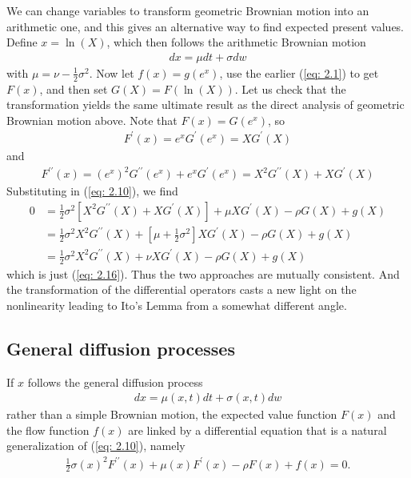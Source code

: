 \documentclass[\topdir/lecture\_notes.tex]{subfiles}
\begin{document}
\begin{optional}
We can change variables to transform geometric Brownian motion into an arithmetic one, and this gives an alternative way to find expected present values. Define $x=\ln (X)$, which then follows the arithmetic Brownian motion
\begin{align*}
dx=\mu dt+\sigma dw 
\end{align*}
with $\mu=\nu-\frac{1}{2} \sigma^{2}$. Now let $f(x)=g\left(e^{x}\right)$, use the earlier (\ref{eq: 2.1}) to get $F(x)$, and then set $G(X)=F(\ln (X))$. Let us check that the transformation yields the same ultimate result as the direct analysis of geometric Brownian motion above. Note that $F(x)=G\left(e^{x}\right)$, so
\begin{align*}
F^{\prime}(x)=e^{x} G^{\prime}\left(e^{x}\right)=X G^{\prime}(X)
\end{align*}
and
\begin{align*}
F^{\prime \prime}(x)=\left(e^{x}\right)^{2} G^{\prime \prime}\left(e^{x}\right)+e^{x} G^{\prime}\left(e^{x}\right)=X^{2} G^{\prime \prime}(X)+X G^{\prime}(X)
\end{align*}
Substituting in (\ref{eq: 2.10}), we find
\begin{align*}
0 & =\frac{1}{2} \sigma^{2}\left[X^{2} G^{\prime \prime}(X)+X G^{\prime}(X)\right]+\mu X G^{\prime}(X)-\rho G(X)+g(X) \\
& =\frac{1}{2} \sigma^{2} X^{2} G^{\prime \prime}(X)+\left[\mu+\frac{1}{2} \sigma^{2}\right] X G^{\prime}(X)-\rho G(X)+g(X) \\
& =\frac{1}{2} \sigma^{2} X^{2} G^{\prime \prime}(X)+\nu X G^{\prime}(X)-\rho G(X)+g(X)
\end{align*}
which is just (\ref{eq: 2.16}). Thus the two approaches are mutually consistent. And the transformation of the differential operators casts a new light on the nonlinearity leading to Ito's Lemma from a somewhat different angle.
\end{optional}

\subsection{General diffusion processes}

If $x$ follows the general diffusion process\begin{align}
dx=\mu(x, t) dt+\sigma(x, t) dw \label{eq: 1.9dp}
\end{align}
rather than a simple Brownian motion, the expected value function $F(x)$ and the flow function $f(x)$ are linked by a differential equation that is a natural generalization of (\ref{eq: 2.10}), namely
\begin{align}
\frac{1}{2} \sigma(x)^{2} F^{\prime \prime}(x)+\mu(x) F^{\prime}(x)-\rho F(x)+f(x)=0.  \label{eq:pdv_no_t}
\end{align}
\end{document}
